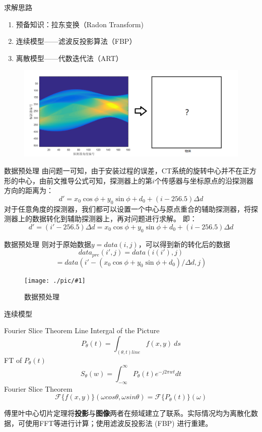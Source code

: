 \documentclass{beamer}
\newcommand{\midpic}[2]{  \begin{figure}[H]
\centering
\texttt{[image: ./pic/\#1]}\\
\caption{#2}
\end{figure}}
\begin{document}
\begin{frame}{求解思路}
	\begin{enumerate}
		\item 预备知识：拉东变换（Radon Transform)
		\item 连续模型——滤波反投影算法（FBP）
		\item 离散模型——代数迭代法（ART）
	\end{enumerate}
	\begin{figure}[H]
		\centering
		\includegraphics[width=1\textwidth]{./pic/pro3.png}\\
		\end{figure}
\end{frame}



\begin{frame}{数据预处理}
	由问题一可知，由于安装过程的误差，CT系统的旋转中心并不在正方形的中心，由前文推导公式可知，探测器上的第\(i\)个传感器与坐标原点的沿探测器方向的距离为：
	\[d' = x_0\cos\phi + y_0\sin\phi + d_0 +  (i - 256.5)\Delta d\]
	对于任意角度的探测器，我们都可以设置一个中心与原点重合的辅助探测器，将探测器上的数据转化到辅助探测器上，再对问题进行求解。
	即：
	\[d' = (i' - 256.5)\Delta d = x_0\cos\phi + y_0\sin\phi + d_0 +  (i - 256.5)\Delta d\]
\end{frame}



\begin{frame}{数据预处理}
	则对于原始数据\( y = data(i,j)\)，可以得到新的转化后的数据
	\[data_{pre}(i',j) = data(i(i'),j)\]
	\[ = data(i' - (x_0\cos\phi + y_0\sin\phi + d_0)/\Delta d,j)\]
	\midpic{datapre3.png}{数据预处理}
\end{frame}



\begin{frame}{连续模型}
	\begin{theorem}	{Fourier Slice Theorem}
		Line Intergal of the Picture
		\[ P_\theta (t) = \int_{(\theta, t) line}f(x, y)\ ds \]
		FT of $P_\theta (t)$
		\[S_\theta (w) = \int_{-\infty}^{\infty}P_\theta (t) e^{-j2\pi wt}dt \]
		Fourier Slice Theorem  
		\[\mathcal{F}\{f(x,y)\}(\omega cos\theta,\omega sin\theta)=\mathcal{F}\{P_\theta(t)\}(\omega)\]
	\end{theorem}
	  
	\footnotesize 傅里叶中心切片定理将\textbf{投影}与\textbf{图像}两者在频域建立了联系。实际情况均为离散化数据，可使用FFT等进行计算；使用滤波反投影法 (FBP) 进行重建。
	  
\end{frame}
  
\end{document}
